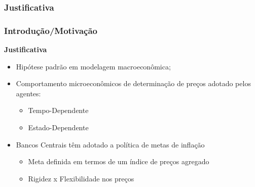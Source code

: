 \documentclass[aspectratio=169]{beamer}
\begin{document}
\begin{frame}
\subsubsection{Justificativa}
\frametitle{Introdução/Motivação}
\textbf{Justificativa}
\begin{itemize}
\item Hipótese padrão em modelagem macroeconômica;
\item Comportamento microeconômicos de determinação de preços adotado pelos agentes:
  \begin{itemize}
  \item Tempo-Dependente
  \item Estado-Dependente
  \end{itemize}
\item Bancos Centrais têm adotado a política de metas de inflação
  \begin{itemize}
  \item Meta definida em termos de um índice de preços agregado
  \item Rigidez x Flexibilidade nos preços
  \end{itemize}
\end{itemize}
\end{frame}

% 
% 
% 
 
\end{document}
